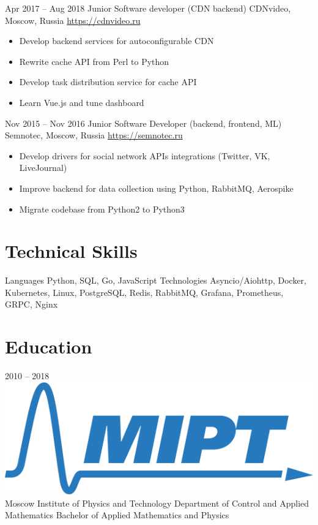 \documentclass[11pt,a4paper]{moderncv}
\begin{document}
  \cventry
    {Apr 2017 – Aug 2018}
    {Junior Software developer (CDN backend)}
    {CDNvideo, Moscow, Russia}
    {\url{https://cdnvideo.ru}}
    {}
    {
      \begin{itemize}\setlength\itemindent{6pt}
        \item Develop backend services for autoconfigurable CDN
        \item Rewrite cache API from Perl to Python
        \item Develop task distribution service for cache API
        \item Learn Vue.js and tune dashboard
      \end{itemize}
    }

  \cventry
    {Nov 2015 – Nov 2016}
    {Junior Software Developer (backend, frontend, ML)}
    {Semnotec, Moscow, Russia}
    {\url{https://semnotec.ru}}
    {}
    {
      \begin{itemize}\setlength\itemindent{6pt}
        \item Develop drivers for social network APIs integrations (Twitter, VK, LiveJournal)
        \item Improve backend for data collection using Python, RabbitMQ, Aerospike
        \item Migrate codebase from Python2 to Python3
      \end{itemize}
    }

\section{Technical Skills}
  \cvline
    {Languages}{
      Python,
      SQL,
      Go,
      JavaScript
    }
  \cvline
    {Technologies}{
      Asyncio/Aiohttp,
      Docker,
      Kubernetes,
      Linux,
      PostgreSQL,
      Redis,
      RabbitMQ,
      Grafana,
      Prometheus,
      GRPC,
      Nginx
    }

\section{Education}
  \vspace*{-5mm}
  \cventry
    {2010 – 2018}
    {\includegraphics[scale=0.5]{mipt-en-blue} Moscow Institute of Physics and Technology}
    {}
    {}{}
    {
      Department of Control and Applied Mathematics \newline{}
      Bachelor of Applied Mathematics and Physics \newline{}
    }
    {}
\end{document}
